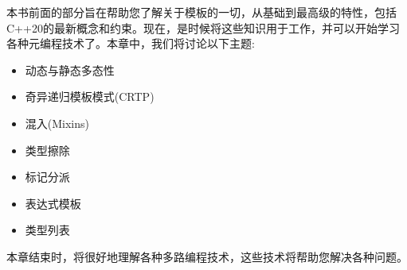 
本书前面的部分旨在帮助您了解关于模板的一切，从基础到最高级的特性，包括C++20的最新概念和约束。现在，是时候将这些知识用于工作，并可以开始学习各种元编程技术了。本章中，我们将讨论以下主题:

\begin{itemize}
\item
动态与静态多态性

\item
奇异递归模板模式(CRTP)

\item
混入(Mixins)

\item
类型擦除

\item
标记分派

\item
表达式模板

\item
类型列表
\end{itemize}

本章结束时，将很好地理解各种多路编程技术，这些技术将帮助您解决各种问题。